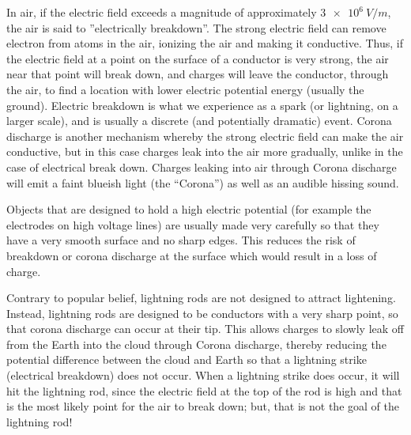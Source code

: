 In air, if the electric field exceeds a magnitude of approximately $\SI{3e6}{V/m}$, the air is said to ''electrically breakdown''. The strong electric field can remove electron from atoms in the air, ionizing the air and making it conductive. Thus, if the electric field at a point on the surface of a conductor is very strong, the air near that point will break down, and charges will leave the conductor, through the air, to find a location with lower electric potential energy (usually the ground). Electric breakdown is what we experience as a spark (or lightning, on a larger scale), and is usually a discrete (and potentially dramatic) event. Corona discharge is another mechanism whereby the strong electric field can make the air conductive, but in this case charges leak into the air more gradually, unlike in the case of electrical break down. Charges leaking into air through Corona discharge will emit a faint blueish light (the ``Corona'') as well as an audible hissing sound.

Objects that are designed to hold a high electric potential (for example the electrodes on high voltage lines) are usually made very carefully so that they have a very smooth surface and no sharp edges. This reduces the risk of breakdown or corona discharge at the surface which would result in a loss of charge.

Contrary to popular belief, lightning rods are not designed to attract lightening. Instead, lightning rods are designed to be conductors with a very sharp point, so that corona discharge can occur at their tip. This allows charges to slowly leak off from the Earth into the cloud through Corona discharge, thereby reducing the potential difference between the cloud and Earth so that a lightning strike (electrical breakdown) does not occur. When a lightning strike does occur, it will hit the lightning rod, since the electric field at the top of the rod is high and that is the most likely point for the air to break down; but, that is not the goal of the lightning rod!
